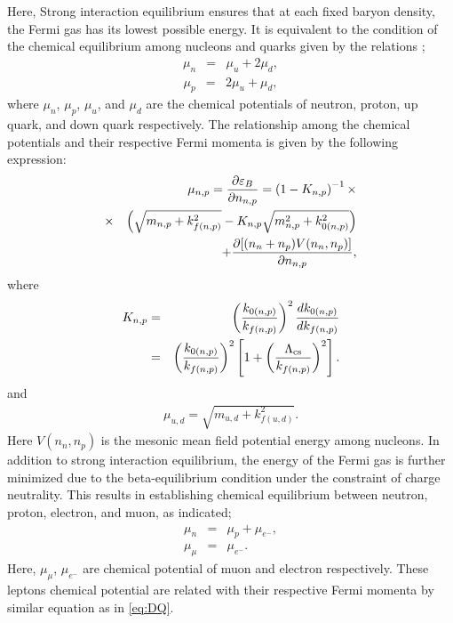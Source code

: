 Here, Strong interaction equilibrium ensures that at each fixed baryon density, the Fermi gas has its lowest possible energy. It is equivalent to the condition of the chemical equilibrium among nucleons and quarks given by the relations \cite{PhysRevD.102.023021}; 
\begin{eqnarray}\label{ebnq}
	\mu_n &=& \mu_u+2\mu_d,
\end{eqnarray}
\begin{eqnarray}
	\mu_p &=& 2\mu_u+\mu_d,
\end{eqnarray}
where $\mu_n$, $\mu_p$, $\mu_u$, and $\mu_d$ are the chemical potentials of neutron, proton, up quark, and down quark respectively. The relationship among the chemical potentials and their respective Fermi momenta is given by the following expression:
\begin{eqnarray}
	&&\hspace*{.5cm}\mu_{n,p}={\partial\varepsilon_B\over\partial n_{n,p}}= \left(1-K_{n,p}\right)^{-1}\times\nonumber\\
	&\times&\left(\sqrt{m_{n,p}+k_{f(n,p)}^2}-K_{n,p}\sqrt{m_{n,p}^2+k_{0(n,p)}^2}\right)\nonumber\\
	&&\hspace*{1cm}+{\partial [(n_n+n_p)V(n_n,n_p)]\over\partial n_{n,p}}, \label{eq:chempo_neutron}
\end{eqnarray}
where
\begin{eqnarray}
	K_{n,p}&=&\left({k_{0(n,p)}\over k_{f(n,p)}}\right)^2{dk_{0(n,p)}\over dk_{f(n,p)}}\nonumber\\
	&=&\left({k_{0(n,p)}\over k_{f(n,p)}}\right)^2\left[1+\left({\Lambda_{\rm cs}\over k_{f(n,p)}}\right)^2\right].
	\label{eq:K}\end{eqnarray}
and 
\begin{eqnarray}
	\mu_{u,d} = \sqrt{ m_{u,d}+k_{f(u,d)}^2 }. 
	\label{eq:DQ}\end{eqnarray}Here $V(n_n,n_p)$ is the mesonic mean field potential energy among nucleons.
In addition to strong interaction equilibrium, the energy of the Fermi gas is further minimized due to the beta-equilibrium condition under the constraint of charge neutrality. This results in establishing chemical equilibrium between neutron, proton, electron, and muon, as indicated\cite{Glendenning,PhysRevD.102.023021};
\begin{eqnarray} \label{qnbe}
	\mu_{n} &=& \mu_{p}+\mu_{e^{-}} , \nonumber \\
	\mu_{\mu} &=& \mu_{e^{-}}.
\end{eqnarray}
Here, $\mu_{\mu}$, $\mu_{e^{-}}$ are chemical potential of muon and electron respectively. These leptons chemical potential are related with their respective Fermi momenta by similar equation as in \ref{eq:DQ}. 

